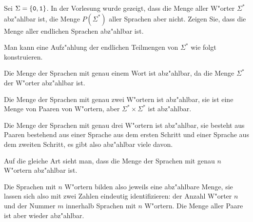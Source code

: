 Sei $\Sigma=\{{\tt 0},{\tt 1}\}$. In der Vorlesung wurde gezeigt, dass 
die Menge aller W"orter $\Sigma^*$ abz"ahlbar ist, die Menge $P(\Sigma^*)$
aller Sprachen aber nicht. Zeigen Sie, dass die Menge aller endlichen
Sprachen abz"ahlbar ist.

\begin{loesung}
Man kann eine Aufz"ahlung der endlichen Teilmengen von $\Sigma^*$ wie
folgt konstruieren.
\begin{compactenum}
\item Die Menge der Sprachen mit genau einem Wort ist abz"ahlbar, da die
Menge $\Sigma^*$ der W"orter abz"ahlbar ist.
\item Die  Menge der Sprachen mit genau zwei W"ortern ist abz"ahlbar,
sie ist eine Menge von Paaren von W"ortern, aber $\Sigma^*\times \Sigma^*$
ist abz"ahlbar.
\item Die Menge der Sprachen mit genau drei W"ortern ist abz"ahlbar,
sie besteht aus Paaren bestehend aus einer Sprache aus dem ersten
Schritt und einer Sprache aus dem zweiten Schritt, es gibt also 
abz"ahlbar viele davon.
\item Auf die gleiche Art sieht man, dass die Menge der Sprachen mit
genau $n$ W"ortern abz"ahlbar ist.
\end{compactenum}
Die Sprachen mit $n$ W"ortern bilden also jeweils eine abz"ahlbare Menge,
sie lassen sich also mit zwei Zahlen eindeutig identifizieren: der Anzahl
W"orter $n$ und der Nummer $m$ innerhalb Sprachen mit $n$ W"ortern.
Die Menge aller Paare ist aber wieder abz"ahlbar.
\end{loesung}

